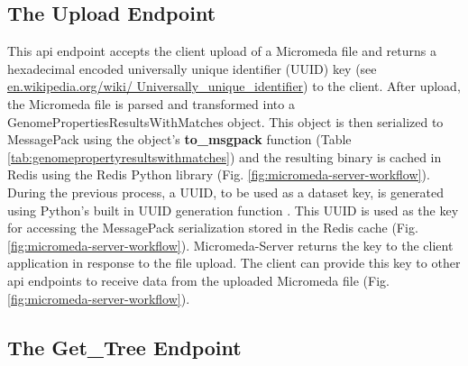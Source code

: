 \subsection{The Upload Endpoint} \label{endpoint-upload}

This \gls{api} endpoint accepts the client upload of a Micromeda file and returns a hexadecimal encoded universally unique identifier (UUID) key \cite{leach2005universally} (see \href{en.wikipedia.org/wiki/Universally\_unique\_identifier}{en.wikipedia.org/wiki/ Universally\_unique\_identifier}) to the client. After upload, the Micromeda file is parsed and transformed into a GenomePropertiesResultsWithMatches object. This object is then serialized to MessagePack using the object's \textbf{to\_msgpack} function (Table \ref{tab:genomepropertyresultswithmatches}) and the resulting binary is cached in Redis using the Redis Python library \cite{mccurdy_2019} (Fig. \ref{fig:micromeda-server-workflow}). During the previous process, a UUID, to be used as a dataset key, is generated using Python's built in UUID generation function \cite{PythonUUID}. This UUID is used as the key for accessing the MessagePack serialization stored in the Redis cache (Fig. \ref{fig:micromeda-server-workflow}). Micromeda-Server returns the key to the client application in response to the file upload. The client can provide this key to other \gls{api} endpoints to receive data from the uploaded Micromeda file (Fig. \ref{fig:micromeda-server-workflow}). 

\subsection{The Get\_Tree Endpoint} \label{get-tree}

